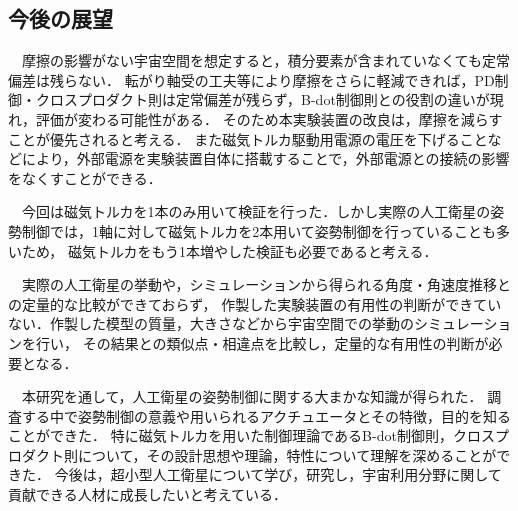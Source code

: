 \subsection{今後の展望}

　摩擦の影響がない宇宙空間を想定すると，積分要素が含まれていなくても定常偏差は残らない．
転がり軸受の工夫等により摩擦をさらに軽減できれば，PD制御・クロスプロダクト則は定常偏差が残らず，B-dot制御則との役割の違いが現れ，評価が変わる可能性がある． 
そのため本実験装置の改良は，摩擦を減らすことが優先されると考える．
また磁気トルカ駆動用電源の電圧を下げることなどにより，外部電源を実験装置自体に搭載することで，外部電源との接続の影響をなくすことができる．

　今回は磁気トルカを1本のみ用いて検証を行った．しかし実際の人工衛星の姿勢制御では，1軸に対して磁気トルカを2本用いて姿勢制御を行っていることも多いため，
磁気トルカをもう1本増やした検証も必要であると考える．

　実際の人工衛星の挙動や，シミュレーションから得られる角度・角速度推移との定量的な比較ができておらず，
作製した実験装置の有用性の判断ができていない．作製した模型の質量，大きさなどから宇宙空間での挙動のシミュレーションを行い，
その結果との類似点・相違点を比較し，定量的な有用性の判断が必要となる．

　本研究を通して，人工衛星の姿勢制御に関する大まかな知識が得られた．
調査する中で姿勢制御の意義や用いられるアクチュエータとその特徴，目的を知ることができた．
特に磁気トルカを用いた制御理論であるB-dot制御則，クロスプロダクト則について，その設計思想や理論，特性について理解を深めることができた．
今後は，超小型人工衛星について学び，研究し，宇宙利用分野に関して貢献できる人材に成長したいと考えている．